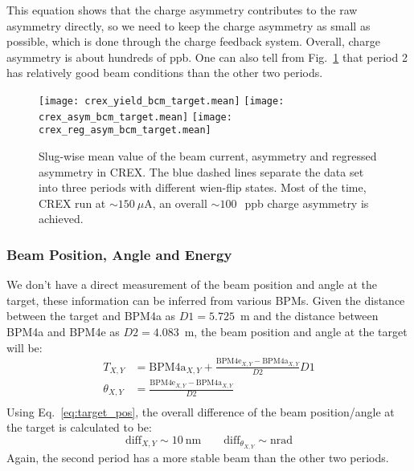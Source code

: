 This equation shows that the charge asymmetry contributes to the raw asymmetry directly, 
so we need to keep the charge asymmetry as small as possible, which is done 
through the charge feedback system. Overall, charge asymmetry is about hundreds of ppb. 
One can also tell from Fig.~\ref{fig:crex_bcm_target}
that period 2 has relatively good beam conditions than the other two periods.
\begin{figure}[H]
    \centering
    \texttt{[image: crex\_yield\_bcm\_target.mean]}
    \texttt{[image: crex\_asym\_bcm\_target.mean]}
    \texttt{[image: crex\_reg\_asym\_bcm\_target.mean]}
    \caption[Asymmetry slug-wise plot]
    {Slug-wise mean value of the beam current, asymmetry and regressed 
    asymmetry in CREX. The blue dashed lines separate
    the data set into three periods with different wien-flip states.
    Most of the time, CREX run at $\sim 150\ \mu$A, an overall $\sim 100~$~ppb charge 
    asymmetry is achieved.}
    \label{fig:crex_bcm_target}
\end{figure}

\subsubsection{Beam Position, Angle and Energy}
We don't have a direct measurement of the beam position and angle at the target, these 
information can be inferred from various BPMs. Given the 
distance between the target and BPM4a as $D1 = 5.725$~m and the distance
between BPM4a and BPM4e as $D2 =4.083$~m, the beam position and angle at the target 
will be:
\begin{equation}
    \begin{aligned}
	T_{X,Y} &= \text{BPM4a}_{X,Y} + \frac{\text{BPM4e}_{X,Y} - \text{BPM4a}_{X,Y}}{D2} D1	\\
	\theta_{X,Y} &= \frac{\text{BPM4e}_{X,Y} - \text{BPM4a}_{X,Y}}{D2} \\
    \end{aligned}
    \label{eq:target_pos}
\end{equation}
Using Eq.~\ref{eq:target_pos}, the overall difference of the beam position/angle 
at the target is calculated to be:
\begin{equation*}
    \text{diff}_{X,Y} \sim 10\ \mathrm{nm}	\qquad \text{diff}_{\theta_{X,Y}} \sim \mathrm{nrad}	
\end{equation*}
Again, the second period has a more stable beam than the other two periods.

